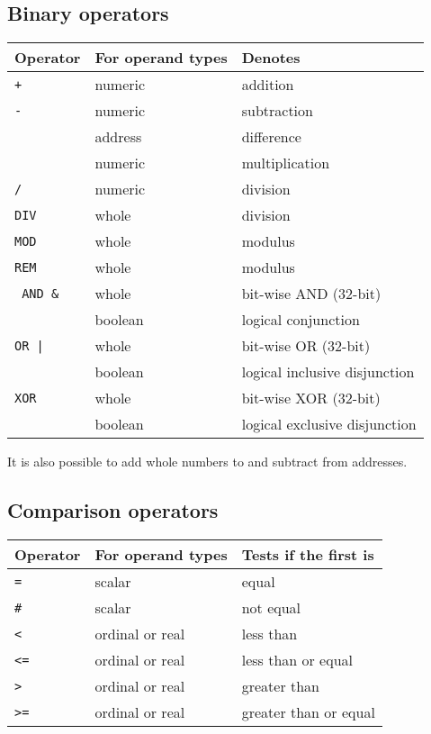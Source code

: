 \subsection{Binary operators}

\begin{tabular}{lll}
\bf Operator & \bf For operand types & \bf Denotes         \\
\hline
\tt +        & numeric               & addition            \\
\tt -        & numeric               & subtraction         \\
\tt          & address               & difference          \\
\tt *        & numeric               & multiplication      \\
\tt /        & numeric               & division            \\
\tt DIV      & whole                 & division            \\
\tt MOD      & whole                 & modulus             \\
\tt REM      & whole                 & modulus             \\
\tt %
\tt AND \&   & whole                 & bit-wise AND (32-bit)  \\
\tt          & boolean               & logical conjunction \\
\tt OR  |    & whole                 & bit-wise OR  (32-bit)  \\
\tt          & boolean               & logical inclusive disjunction \\
\tt XOR      & whole                 & bit-wise XOR (32-bit)  \\
\tt          & boolean               & logical exclusive disjunction
\end{tabular}

It is also possible to add whole numbers to and subtract from addresses.

\subsection{Comparison operators}

\begin{tabular}{lll}
\bf Operator & \bf For operand types & \bf Tests if the first is        \\
\hline
\tt =        & scalar                & equal     \\
\tt \#       & scalar                & not equal \\
\tt <        & ordinal or real       & less than \\
\tt <=       & ordinal or real       & less than or equal \\
\tt >        & ordinal or real       & greater than \\
\tt >=       & ordinal or real       & greater than or equal
\end{tabular}

